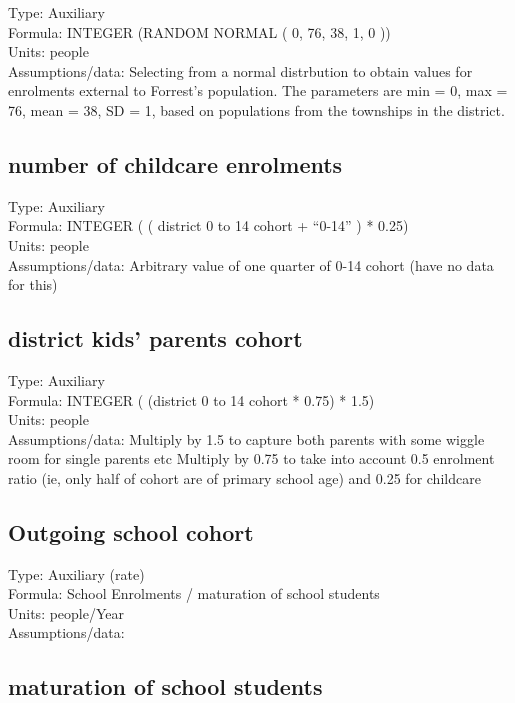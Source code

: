 \documentclass[
  11pt,
]{book}
\begin{document}
Type: Auxiliary\\
Formula: INTEGER (RANDOM NORMAL ( 0, 76, 38, 1, 0 ))\\
Units: people\\
Assumptions/data: Selecting from a normal distrbution to obtain values for enrolments external to Forrest's population. The parameters are min = 0, max = 76, mean = 38, SD = 1, based on populations from the townships in the district.

\hypertarget{number-of-childcare-enrolments}{%
\subsection{number of childcare enrolments}\label{number-of-childcare-enrolments}}

Type: Auxiliary\\
Formula: INTEGER ( ( district 0 to 14 cohort + ``0-14'' ) * 0.25)\\
Units: people\\
Assumptions/data: Arbitrary value of one quarter of 0-14 cohort (have no data for this)

\hypertarget{district-kids-parents-cohort}{%
\subsection{district kids' parents cohort}\label{district-kids-parents-cohort}}

Type: Auxiliary\\
Formula: INTEGER ( (district 0 to 14 cohort * 0.75) * 1.5)\\
Units: people\\
Assumptions/data: Multiply by 1.5 to capture both parents with some wiggle room for single parents etc
Multiply by 0.75 to take into account 0.5 enrolment ratio (ie, only half of cohort are of primary school age) and 0.25 for childcare

\hypertarget{outgoing-school-cohort}{%
\subsection{Outgoing school cohort}\label{outgoing-school-cohort}}

Type: Auxiliary (rate)\\
Formula: School Enrolments / maturation of school students\\
Units: people/Year\\
Assumptions/data:

\hypertarget{maturation-of-school-students}{%
\subsection{maturation of school students}\label{maturation-of-school-students}}
\end{document}
